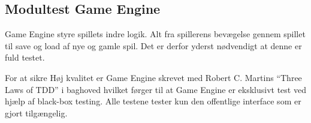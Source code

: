 \subsection{Modultest Game Engine}
Game Engine styre spillets indre logik. Alt fra spillerens bevægelse gennem
spillet til save og load af nye og gamle spil.
Det er derfor yderst nødvendigt at denne er fuld testet.

For at sikre Høj kvalitet er Game Engine skrevet med Robert C. Martins
``Three Laws of TDD'' \parencite{CleanCode} i baghoved hvilket førger til at Game Engine er 
eksklusivt test ved hjælp af black-box testing. Alle testene tester
kun den offentlige interface som er gjort tilgængelig. 

\newpage 



\newpage
